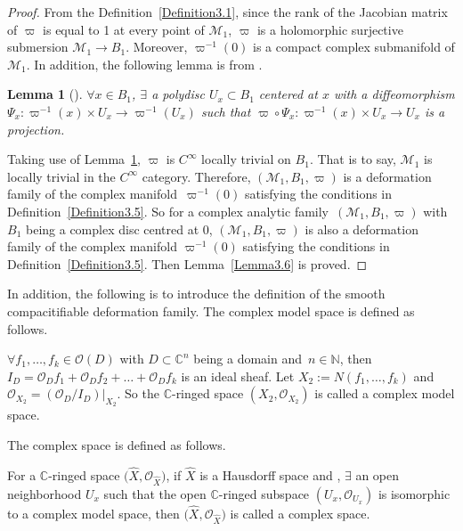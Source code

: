 \documentclass[pdftex]{sigma}
\numberwithin{equation}{section}
\newtheorem{Lemma}[Theorem]{Lemma}
\begin{document}
\begin{proof}
From the Definition~\ref{Definition3.1}, since the rank of the Jacobian matrix of $\varpi$ is equal to 1 at every point of $\mathcal{M}_1$, $\varpi$ is a holomorphic surjective submersion $\mathcal{M}_1 \rightarrow B_1$. Moreover, $\varpi^{-1}(0)$ is a compact complex submanifold of $\mathcal{M}_1$. In addition, the following lemma is from \cite{Kunihiko}.

\begin{Lemma}[{\cite[Theorem~2.5]{Kunihiko}}] \label{Lemma3.7} $\forall x \in B_1$, $\exists$ a polydisc $U_x \subset B_1$ centered at $x$ with a diffeomorphism $\Psi_x \colon \varpi^{-1}(x) \times U_x \rightarrow \varpi^{-1}(U_x)$ such that $\varpi \circ \Psi_x \colon \varpi^{-1}(x) \times U_x \rightarrow U_x$ is a projection.
\end{Lemma}

Taking use of Lemma~\ref{Lemma3.7}, $\varpi$ is $C^\infty$ locally trivial on $B_1$. That is to say, $\mathcal{M}_1$ is locally trivial in the $C^\infty$ category. Therefore, $(\mathcal{M}_1, B_1, \varpi)$ is a deformation family of the complex manifold~$\varpi^{-1}(0)$ satisfying the conditions in Definition~\ref{Definition3.5}. So for a complex analytic family~$(\mathcal{M}_1, B_1, \varpi)$ with $B_1$ being a complex disc centred at $0$, $(\mathcal{M}_1, B_1, \varpi)$ is also a deformation family of the complex manifold $\varpi^{-1}(0)$ satisfying the conditions in Definition~\ref{Definition3.5}. Then Lemma~\ref{Lemma3.6} is proved.
\end{proof}


In addition, the following is to introduce the definition of the smooth compacitifiable deformation family. The complex model space is defined as follows.

\begin{Definition} \label{Definition3.8}
$\forall f_1,\dots ,f_k \in \mathcal{O}(D)$ with $D \subset \mathbb{C}^n$ being a domain and~${n \in \mathbb{N}}$, then $I_D=\mathcal{O}_Df_1+\mathcal{O}_Df_2+\dots +\mathcal{O}_Df_k$ is an ideal sheaf. Let $X_2:=N(f_1,\dots ,f_k)$ and $\mathcal{O}_{X_2}=(\mathcal{O}_D/I_D)|_{X_2}$. So the $\mathbb{C}$-ringed space $(X_2,\mathcal{O}_{X_2})$ is called a complex model space.
\end{Definition}

The complex space is defined as follows.

\begin{Definition} \label{Definition3.9}
For a $\mathbb{C}$-ringed space $\bigl(\hat{X},\mathcal{O}_{\hat{X}}\bigr)$, if $\hat{X}$ is a Hausdorff space and , $\exists$ an open neighborhood $U_x$ such that the open $\mathbb{C}$-ringed subspace $(U_x,\mathcal{O}_{U_x})$ is isomorphic to a complex model space, then $\bigl(\hat{X},\mathcal{O}_{\hat{X}}\bigr)$ is called a complex space.
\end{Definition}
\end{document}
